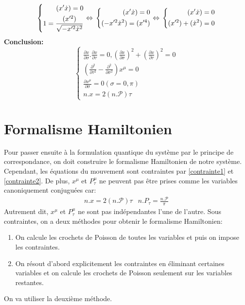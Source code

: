 \documentclass[a4paper,12pt]{article}
\def\xmu{x^\mu}
\def\pt{P_\tau}
\begin{document}
\begin{equation}
	\left\lbrace
	\begin{aligned}
	(x'\dot{x})=0\\
	1=\frac{ (x'^2)}{\sqrt{-x'^2\dot{x}^2}}
	\end{aligned}
	\right.
	\Leftrightarrow\\
	\left\lbrace
	\begin{aligned}
	(x'\dot{x})=0\\
	(-x'^2\dot{x}^2)=(x'^4)
	\end{aligned}
	\right.	
	\Leftrightarrow\\
	\left\lbrace
	\begin{aligned}
	(x'\dot{x})=0\\
	(x'^2)+(\dot{x}^2)=0
	\end{aligned}
	\right.	
\end{equation}
\textbf{Conclusion:}
\begin{equation}
	\left\lbrace
    \begin{aligned}
        \frac{\partial x}{\partial \sigma}.\frac{\partial x}{\partial \tau}=0, \left( \frac{\partial x}{\partial \sigma}\right) ^2+\left( \frac{\partial x}{\partial \tau}\right) ^2=0\\
        \left( \frac{\partial^2}{\partial  \tau^2}-\frac{\partial^2}{\partial  \sigma^2}\right) \xmu=0\\
        \frac{\partial \xmu}{\partial \sigma}=0 	 (\sigma=0,\pi)\\
        n.x=2(n.\mathcal{P})\tau
        \end{aligned}
        \right.
\end{equation}
\section{Formalisme Hamiltonien}
Pour passer ensuite à la formulation quantique du système par le principe de correspondance, on doit construire le formalisme Hamiltonien de notre système. Cependant, les équations du mouvement sont contraintes par \eqref{contrainte1} et \eqref{contrainte2}.
De plus, $\xmu$ et $P_\tau^\mu$ ne peuvent pas être prises comme les variables canoniquement conjuguées car:
\begin{align*}
& n.x=2(n.\mathcal{P})\tau & n.P_\tau=\frac{n.\mathcal{P}}{\pi}&
\end{align*}
Autrement dit, $\xmu$ et $\pt^\mu$ ne sont pas indépendantes l'une de l'autre. Sous contraintes, on a deux méthodes pour obtenir le formalisme Hamiltonien:
\begin{enumerate}
\item On calcule les crochets de Poisson de toutes les variables et puis on impose les contraintes.
\item On résout d'abord explicitement les contraintes en éliminant certaines variables et on calcule les crochets de Poisson seulement sur les variables restantes.
\end{enumerate} 
On va utiliser la deuxième méthode.
\end{document}
